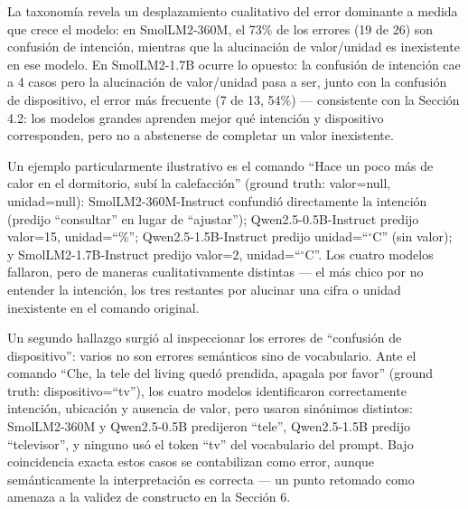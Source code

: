 La taxonomía revela un desplazamiento cualitativo del error dominante a
medida que crece el modelo: en SmolLM2-360M, el 73\% de los errores (19 de
26) son confusión de intención, mientras que la alucinación de valor/unidad
es inexistente en ese modelo. En SmolLM2-1.7B ocurre lo opuesto: la
confusión de intención cae a 4 casos pero la alucinación de valor/unidad
pasa a ser, junto con la confusión de dispositivo, el error más frecuente
(7 de 13, 54\%) — consistente con la Sección 4.2: los modelos grandes
aprenden mejor qué intención y dispositivo corresponden, pero no a
abstenerse de completar un valor inexistente.

Un ejemplo particularmente ilustrativo es el comando ``Hace un poco más de
calor en el dormitorio, subí la calefacción'' (ground truth: valor=null,
unidad=null): SmolLM2-360M-Instruct confundió directamente la intención
(predijo ``consultar'' en lugar de ``ajustar''); Qwen2.5-0.5B-Instruct
predijo valor=15, unidad=``\%''; Qwen2.5-1.5B-Instruct predijo
unidad=``$^{\circ}$C'' (sin valor); y SmolLM2-1.7B-Instruct predijo valor=2,
unidad=``$^{\circ}$C''. Los cuatro modelos fallaron, pero de maneras
cualitativamente distintas — el más chico por no entender la intención, los
tres restantes por alucinar una cifra o unidad inexistente en el comando
original.

Un segundo hallazgo surgió al inspeccionar los errores de ``confusión de
dispositivo'': varios no son errores semánticos sino de vocabulario. Ante el
comando ``Che, la tele del living quedó prendida, apagala por favor''
(ground truth: dispositivo=``tv''), los cuatro modelos identificaron
correctamente intención, ubicación y ausencia de valor, pero usaron
sinónimos distintos: SmolLM2-360M y Qwen2.5-0.5B predijeron ``tele'',
Qwen2.5-1.5B predijo ``televisor'', y ninguno usó el token ``tv'' del
vocabulario del prompt. Bajo coincidencia exacta estos casos se contabilizan
como error, aunque semánticamente la interpretación es correcta — un punto
retomado como amenaza a la validez de constructo en la Sección 6.
